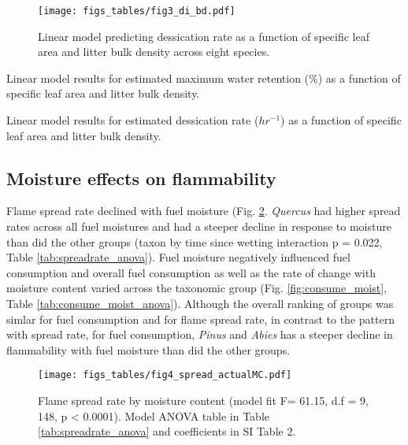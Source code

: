 \documentclass[fire,article,submit,moreauthors,pdftex]{Definitions/mdpi}
\begin{document}
\begin{figure}[H]
  \centering
\texttt{[image: figs\_tables/fig3\_di\_bd.pdf]}
\caption{Linear model predicting dessication rate as a function of specific leaf area and litter bulk density across eight species.}
  \label{fig:bd-di}
\end{figure}

\begin{table}[H]
  \caption{Linear model results for estimated maximum water retention (\%) as a function of specific leaf area and litter bulk density.}
  \label{tab:di_anova}
\centering

\end{table}


\begin{table}[H]
  \caption{Linear model results for estimated dessication rate ($hr^{-1}$) as a function of specific leaf area and litter bulk density.}
  \label{tab2:di-anova}
\centering

\end{table}



\subsection{Moisture effects on flammability}


Flame spread rate declined with fuel moisture (Fig. \ref{fig:spread_moist}. \emph{Quercus} had higher spread rates across all fuel moistures and had a steeper decline in response to moisture than did the other groups (taxon by time since wetting interaction p = 0.022, Table \ref{tab:spreadrate_anova}). Fuel moisture negatively influenced fuel consumption and overall  fuel consumption as well as the rate of change with moisture content varied across the taxonomic group (Fig. \ref{fig:consume_moist}, Table \ref{tab:consume_moist_anova}). Although the overall ranking of groups was simlar for fuel consumption and for flame spread rate, in contrast to the pattern with spread rate, for fuel consumption, \emph{Pinus} and \emph{Abies} has a steeper decline in flammability with fuel moisture than did the other groups.

\begin{figure}[H]
  \centering
\texttt{[image: figs\_tables/fig4\_spread\_actualMC.pdf]}
\caption{Flame spread rate by moisture content (model fit F= 61.15, d.f = 9, 148,  p < 0.0001). Model ANOVA table in Table \ref{tab:spreadrate_anova} and coefficients in SI Table 2.}
  \label{fig:spread_moist}
\end{figure}
\end{document}
